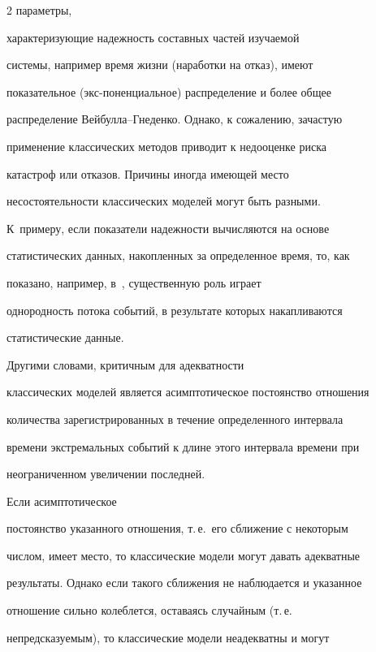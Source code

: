 \begin{multicols}{2}
параметры,\linebreak


 характеризующие на\-деж\-ность составных час\-тей изучаемой


системы, например время жизни (на\-ра\-бот\-ки на отказ), имеют


показательное (экс-\linebreak по\-нен\-ци\-аль\-ное) распределение и более общее


распределе\-ние Вей\-бул\-ла--Гне\-ден\-ко. Однако, к сожалению, за\-час\-тую


применение классических методов приводит к недооценке риска


катастроф или отказов. Причины иногда имеющей место


несостоятельности классических моделей могут быть разными. 


К~примеру, если показатели на\-деж\-ности вычисляются на осно\-ве


статистических данных, накопленных за определенное время, то, как


показано, например, в~\cite{BKSSh2007}, существенную роль играет


однородность потока событий, в результате которых накапливаются


статистические данные. 





Другими словами, критичным для адекват\-ности


классических моделей является асимптотическое постоянство отношения


количества зарегистрированных в течение определенного интервала


времени экстремальных событий к длине этого интервала времени при


неограниченном увеличении по\-следней. 





Если асимптотическое


постоянство указанного отношения, т.\,е.\ его сближение с некоторым


чис\-лом, имеет место, то классические модели могут давать адекватные


результаты. Однако если такого сближения не наблюдается и указанное


отношение сильно колеблется, оставаясь случайным (т.\,е.\


непредсказуемым), то классические модели неадекватны и могут



\end{multicols}
